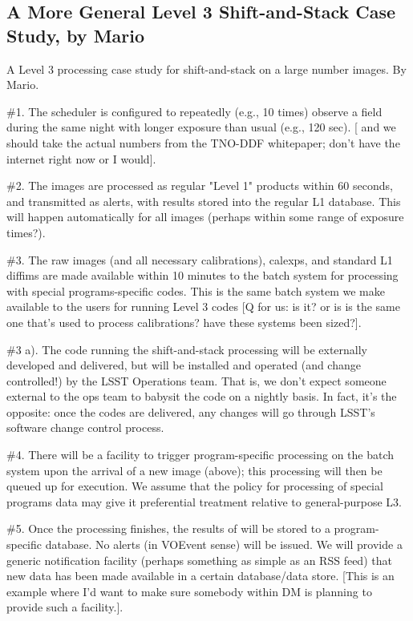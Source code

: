 \subsection{A More General Level 3 Shift-and-Stack Case Study, by Mario}\label{ssec:SPCS_SAS}

A Level 3 processing case study for shift-and-stack on a large number images. By Mario.

\#1. The scheduler is configured to repeatedly (e.g., 10 times) observe a field during the same night with longer exposure than usual (e.g., 120 sec). [ and we should take the actual numbers from the TNO-DDF whitepaper; don't have the internet right now or I would].

\#2. The images are processed as regular "Level 1" products within 60 seconds, and transmitted as alerts, with results stored into the regular L1 database. This will happen automatically for all images (perhaps within some range of exposure times?).

\#3. The raw images (and all necessary calibrations), calexps, and standard L1 diffims are made available within 10 minutes to the batch system for processing with special programs-specific codes. This is the same batch system we make available to the users for running Level 3 codes [Q for us: is it? or is is the same one that's used to process calibrations? have these systems been sized?].

\#3 a). The code running the shift-and-stack processing will be externally developed and delivered, but will be installed and operated (and change controlled!) by the LSST Operations team. That is, we don't expect someone external to the ops team to babysit the code on a nightly basis. In fact, it's the opposite: once the codes are delivered, any changes will go through LSST's software change control process.

\#4. There will be a facility to trigger program-specific processing on the batch system upon the arrival of a new image (above); this processing will then be queued up for execution. We assume that the policy for processing of special programs data may give it preferential treatment relative to general-purpose L3.

\#5. Once the processing finishes, the results of will be stored to a program-specific database. No alerts (in VOEvent sense) will be issued. We will provide a generic notification facility (perhaps something as simple as an RSS feed) that new data has been made available in a certain database/data store. [This is an example where I'd want to make sure somebody within DM is planning to provide such a facility.].

